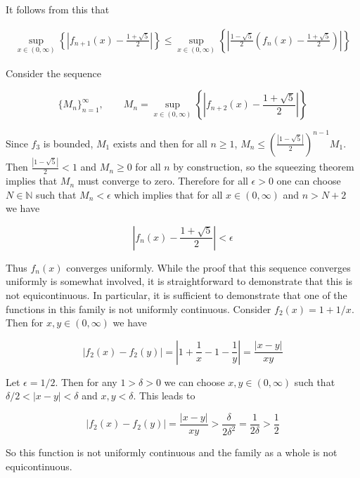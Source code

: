 \documentclass{article}
\begin{document}
It follows from this that 

\begin{align*}
    \sup_{x \in (0,\infty)}\left\{\left|f_{n+1}(x) - \frac{1+\sqrt{5}}{2} \right|\right\} \leq \sup_{x \in (0,\infty)}\left\{\left|\frac{1-\sqrt{5}}{2}\left(f_n(x) - \frac{1 + \sqrt{5}}{2}\right)\right|\right\}
\end{align*}

Consider the sequence

\begin{equation*}
    \{M_n\}_{n=1}^{\infty}, \qquad M_n = \sup_{x \in (0,\infty)}\left\{\left|f_{n+2}(x) - \frac{1+\sqrt{5}}{2} \right|\right\}
\end{equation*}

Since $f_3$ is bounded, $M_1$ exists and then for all $n \geq 1$, $M_n \leq \left(\frac{|1 - \sqrt{5}|}{2}\right)^{n-1}M_1$. 
Then $\frac{|1 - \sqrt{5}|}{2} < 1$ and $M_n \geq 0$ for all $n$ by construction, so the squeezing 
theorem implies that $M_n$ must converge to zero. Therefore for all $\epsilon > 0$ one can choose 
$N \in \mathbb{N}$ such that $M_n < \epsilon$ which implies that for all $x \in (0,\infty)$ and 
$n > N+2$ we have

\begin{equation*}
    \left|f_n(x) - \frac{1 + \sqrt{5}}{2}\right| < \epsilon
\end{equation*}

Thus $f_n(x)$ converges uniformly. While the proof that this sequence converges uniformly is 
somewhat involved, it is straightforward to demonstrate that this is not equicontinuous. In 
particular, it is sufficient to demonstrate that one of the functions in this 
family is not uniformly continuous. Consider $f_2(x) = 1 + 1/x$. Then for $x,y \in (0,\infty)$ 
we have 

\begin{equation*}
    |f_2(x) - f_2(y)| = \left|1 + \frac{1}{x} - 1 - \frac{1}{y} \right| = \frac{|x - y|}{xy}
\end{equation*}

Let $\epsilon = 1/2$. Then for any $1 > \delta > 0$ we can choose $x,y \in (0,\infty)$ such that $\delta/2 <|x -y| < \delta$ 
and $x,y < \delta$. This leads to 

\begin{equation*}
    |f_2(x) - f_2(y)| = \frac{|x - y|}{xy} > \frac{\delta}{2\delta^2} = \frac{1}{2\delta} > \frac{1}{2}
\end{equation*}

So this function is not uniformly continuous and the family as a whole is not equicontinuous.
\end{document}
